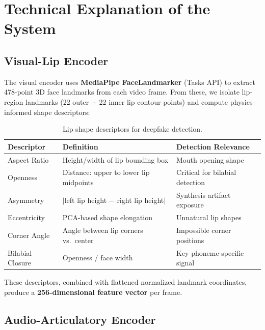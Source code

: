 \documentclass[11pt,a4paper]{article}
\begin{document}
\section{Technical Explanation of the System}

\subsection{Visual-Lip Encoder}

The visual encoder uses \textbf{MediaPipe FaceLandmarker} (Tasks API) \citep{lugaresi2019mediapipe} to extract 478-point 3D face landmarks from each video frame. From these, we isolate lip-region landmarks (22 outer + 22 inner lip contour points) and compute physics-informed shape descriptors:

\begin{table}[H]
\centering
\caption{Lip shape descriptors for deepfake detection.}
\label{tab:descriptors}
\small
\begin{tabular}{@{}lll@{}}
\toprule
\textbf{Descriptor} & \textbf{Definition} & \textbf{Detection Relevance} \\
\midrule
Aspect Ratio    & Height/width of lip bounding box          & Mouth opening shape \\
Openness        & Distance: upper to lower lip midpoints    & Critical for bilabial detection \\
Asymmetry       & $|$left lip height $-$ right lip height$|$   & Synthesis artifact exposure \\
Eccentricity    & PCA-based shape elongation                & Unnatural lip shapes \\
Corner Angle    & Angle between lip corners vs.\ center     & Impossible corner positions \\
Bilabial Closure & Openness / face width                    & Key phoneme-specific signal \\
\bottomrule
\end{tabular}
\end{table}

These descriptors, combined with flattened normalized landmark coordinates, produce a \textbf{256-dimensional feature vector} per frame.

\subsection{Audio-Articulatory Encoder}
\end{document}
